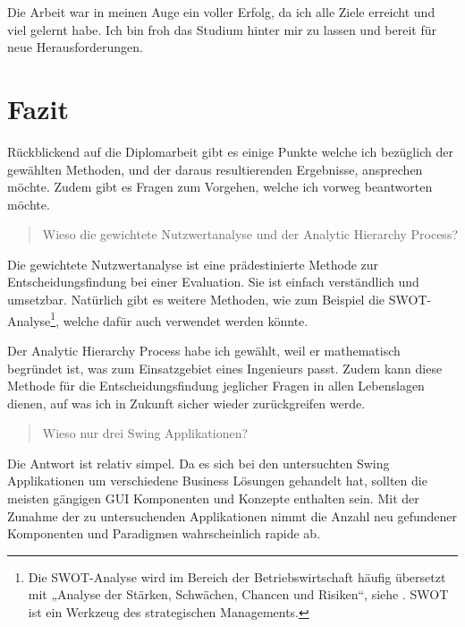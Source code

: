 Die Arbeit war in meinen Auge ein voller Erfolg, da ich alle Ziele erreicht und
viel gelernt habe. Ich bin froh das Studium hinter mir zu lassen und bereit für
neue Herausforderungen.

\section{Fazit}

Rückblickend auf die Diplomarbeit gibt es einige Punkte welche ich bezüglich der
gewählten Methoden, und der daraus resultierenden Ergebnisse, ansprechen möchte.
Zudem gibt es Fragen zum Vorgehen, welche ich vorweg beantworten möchte.
\newline

\begin{quote}\begin{itshape}Wieso die gewichtete Nutzwertanalyse und der
Analytic Hierarchy Process?\end{itshape}\end{quote}

Die gewichtete Nutzwertanalyse ist eine prädestinierte Methode zur
Entscheidungsfindung bei einer Evaluation. Sie ist einfach verständlich und
umsetzbar. Natürlich gibt es weitere Methoden, wie zum Beispiel die
SWOT-Analyse\footnote{Die SWOT-Analyse wird im Bereich der Betriebswirtschaft
häufig übersetzt mit „Analyse der Stärken, Schwächen, Chancen und
Risiken“, siehe \cite{SWOT}. SWOT ist ein Werkzeug des strategischen
Managements.}, welche dafür auch verwendet werden könnte.

Der Analytic Hierarchy Process habe ich gewählt, weil er mathematisch begründet
ist, was zum Einsatzgebiet eines Ingenieurs passt. Zudem kann diese Methode für
die Entscheidungsfindung jeglicher Fragen in allen Lebenslagen dienen, auf
was ich in Zukunft sicher wieder zurückgreifen werde.
\newline

\begin{quote}\begin{itshape}Wieso nur drei Swing
Applikationen?\end{itshape}\end{quote}

Die Antwort ist relativ simpel. Da es sich bei den untersuchten Swing
Applikationen um verschiedene Business Lösungen gehandelt hat, sollten die
meisten gängigen GUI Komponenten und Konzepte enthalten sein. Mit der Zunahme
der zu untersuchenden Applikationen nimmt die Anzahl neu gefundener Komponenten
und Paradigmen wahrscheinlich rapide ab.
\newline

